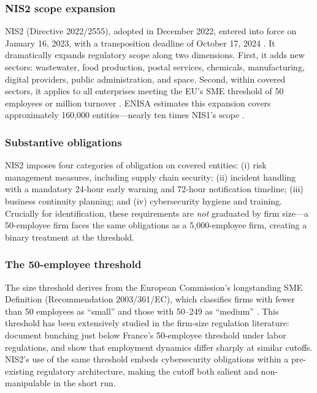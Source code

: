 \documentclass[12pt]{article}
\begin{document}
\subsubsection*{NIS2 scope expansion} NIS2 (Directive 2022/2555), adopted in December 2022, entered into force on January 16, 2023, with a transposition deadline of October 17, 2024 \citep{eu2022nis2}. It dramatically expands regulatory scope along two dimensions. First, it adds new sectors: wastewater, food production, postal services, chemicals, manufacturing, digital providers, public administration, and space. Second, within covered sectors, it applies to all enterprises meeting the EU's SME threshold of 50 employees or  million turnover \citep{eu2003sme}. ENISA estimates this expansion covers approximately 160,000 entities---nearly ten times NIS1's scope \citep{enisa2023nis}.

\subsubsection*{Substantive obligations} NIS2 imposes four categories of obligation on covered entities: (i) risk management measures, including supply chain security; (ii) incident handling with a mandatory 24-hour early warning and 72-hour notification timeline; (iii) business continuity planning; and (iv) cybersecurity hygiene and training. Crucially for identification, these requirements are \textit{not} graduated by firm size---a 50-employee firm faces the same obligations as a 5,000-employee firm, creating a binary treatment at the threshold.

\subsubsection*{The 50-employee threshold} The size threshold derives from the European Commission's longstanding SME Definition (Recommendation 2003/361/EC), which classifies firms with fewer than 50 employees as ``small'' and those with 50--249 as ``medium'' \citep{eu2003sme}. This threshold has been extensively studied in the firm-size regulation literature: \citet{garicano2016firm} document bunching just below France's 50-employee threshold under labor regulations, and \citet{haltiwanger2013creates} show that employment dynamics differ sharply at similar cutoffs. NIS2's use of the same threshold embeds cybersecurity obligations within a pre-existing regulatory architecture, making the cutoff both salient and non-manipulable in the short run.
\end{document}
